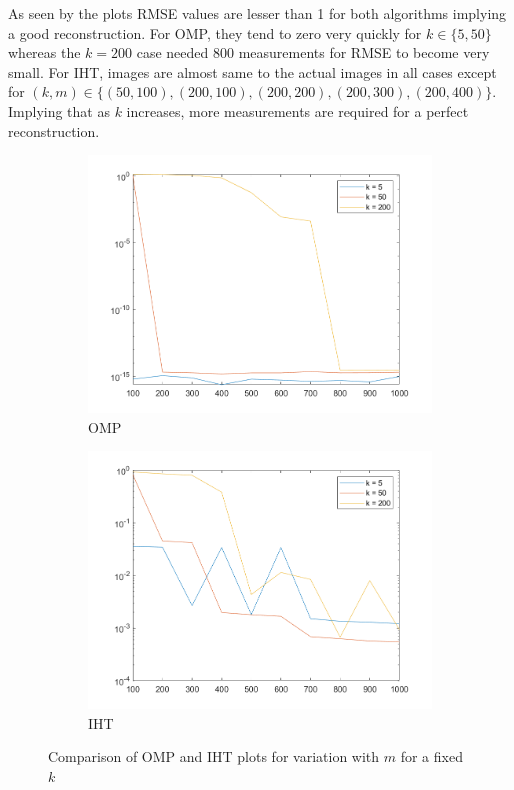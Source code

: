 \documentclass[a4paper, landscape]{article}
\begin{document}
As seen by the plots RMSE values are lesser than 1 for both algorithms implying a good reconstruction. For OMP, they tend to zero very quickly for $k\in\{5,50\}$ whereas the $k=200$ case needed $800$ measurements for RMSE to become very small. For IHT, images are almost same to the actual images in all cases except for $(k,m)\in\{(50,100), (200,100), (200,200), (200,300), (200,400)\}$. Implying that as $k$ increases, more measurements are required for a perfect reconstruction.
\begin{figure}[H]
    \centering
    \begin{subfigure}{0.45\linewidth}
        \centering
        \includegraphics[width=\linewidth]{omp/plot k.png}
        \caption{OMP}
    \end{subfigure}
    \begin{subfigure}{0.45\linewidth}
        \centering
        \includegraphics[width=\linewidth]{iht/plot k.png}
        \caption{IHT}
    \end{subfigure}
    \caption{Comparison of OMP and IHT plots for variation with $m$ for a fixed $k$}
    \label{fig:ck}
\end{figure}
\end{document}
